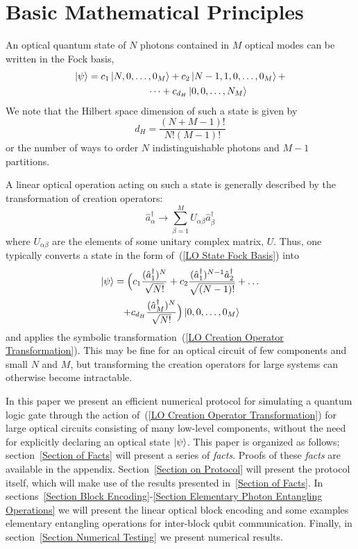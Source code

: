 \documentclass[aps,pra,twocolumn,showpacs,superscriptaddress,floatfix,10pt]{revtex4}
\begin{document}
\section{Basic Mathematical Principles}
\label{Intro}
An optical quantum state of $N$ photons contained in $M$ optical modes can be written in the Fock basis,
\begin{eqnarray}
	\label{LO State Fock Basis}
	\ket{\psi} = c_1 \ket{N,0,\dots,0_M} + c_2 \ket{N-1,1,0,\dots, 0_M} + \\* \dots  + c_{d_H} \ket{0,0,\dots,N_M}	\nonumber \quad \quad \quad \quad
\end{eqnarray}
We note that the Hilbert space dimension of such a state is given by
\begin{equation}
\label{Hilbert Space Dimension}
	d_H = \frac{(N+M-1)!}{N!(M-1)!}
\end{equation}
or the number of ways to order $N$ indistinguishable photons and $M-1$ partitions.

A linear optical operation acting on such a state is generally described by the transformation of creation operators:
\begin{equation}
\label{LO Creation Operator Transformation}
\hat{a}^\dagger_\alpha \rightarrow \sum_{\beta=1}^{M} U_{\alpha\beta} \hat{a}^\dagger_\beta
\end{equation}
where $U_{\alpha \beta}$ are the elements of some unitary complex matrix, $U$. Thus, one typically converts a state in the form of~(\ref{LO State Fock Basis}) into
\begin{eqnarray}
\ket{\psi} = \Big(c_1 \frac{(\hat{a}^\dagger_1)^N}{\sqrt{N!}} + c_2 \frac{ (\hat{a}^\dagger_1)^{N-1} \hat{a}^\dagger_2}{\sqrt{(N-1)!}} + \dots \\* + c_{d_H} \frac{(\hat{a}^\dagger_M)^N}{\sqrt{N!}}\Big) \ket{0,0,\dots,0_M} \quad \quad \nonumber
\end{eqnarray}
and applies the symbolic transformation~(\ref{LO Creation Operator Transformation}). This may be fine for an optical circuit of few components and small $N$ and $M$, but transforming the creation operators for large systems can otherwise become intractable. 

In this paper we present an efficient numerical protocol for simulating a quantum logic gate through the action of~(\ref{LO Creation Operator Transformation}) for large optical circuits consisting of many low-level components, without the need for explicitly declaring an optical state $\ket{\psi}$. This paper is organized as follows; section~\ref{Section of Facts} will present a series of \textit{facts}. Proofs of these \textit{facts} are available in the appendix. Section~\ref{Section on Protocol} will present the protocol itself, which will make use of the results presented in~\ref{Section of Facts}. In sections~\ref{Section Block Encoding}-\ref{Section Elementary Photon Entangling Operations} we will present the linear optical block encoding and some examples elementary entangling operations for inter-block qubit communication. Finally, in section~\ref{Section Numerical Testing} we present numerical results.
\end{document}
